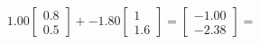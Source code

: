 \documentclass[preview]{standalone}
\begin{document}
\begin{align*}
1.00 \begin{bmatrix} 0.8 \\ 0.5 \end{bmatrix} + -1.80 \begin{bmatrix} 1 \\ 1.6 \end{bmatrix} = \begin{bmatrix} -1.00 \\ -2.38 \end{bmatrix} =
\end{align*}
\end{document}
